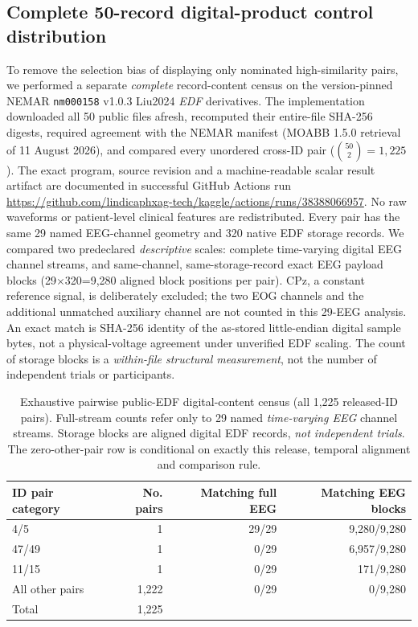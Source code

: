 \subsection{Complete 50-record digital-product control distribution}
\label{sec:p2-exhaustive-nemar}
To remove the selection bias of displaying only nominated
high-similarity pairs, we performed a separate \emph{complete}
record-content census on the version-pinned NEMAR
\texttt{nm000158} v1.0.3 Liu2024 \emph{EDF} derivatives.
The implementation downloaded all 50 public files afresh,
recomputed their entire-file SHA-256 digests, required agreement
with the NEMAR manifest (MOABB 1.5.0 retrieval of 11 August 2026),
and compared every unordered cross-ID pair
($\binom{50}{2}=1{,}225$).
The exact program, source revision and a machine-readable
scalar result artifact are documented in successful
GitHub Actions run
\url{https://github.com/lindicaphxag-tech/kaggle/actions/runs/38388066957}.
No raw waveforms or patient-level clinical features are
redistributed. Every pair has the same 29 named EEG-channel
geometry and 320 native EDF storage records. We compared
two predeclared \emph{descriptive} scales:
complete time-varying digital EEG channel streams,
and same-channel, same-storage-record exact EEG payload
blocks (29$\times$320=9,280 aligned block positions per pair).
CPz, a constant reference signal, is deliberately excluded;
the two EOG channels and the additional unmatched auxiliary
channel are not counted in this 29-EEG analysis.
An exact match is SHA-256 identity of the as-stored
little-endian digital sample bytes, not a physical-voltage
agreement under unverified EDF scaling. The count of
storage blocks is a \emph{within-file structural
measurement}, not the number of independent trials or
participants.

\begin{table}[ht]
\centering\small
\caption{Exhaustive pairwise public-EDF digital-content census
(all 1,225 released-ID pairs). Full-stream counts refer only to
29 named \emph{time-varying EEG} channel streams. Storage blocks
are aligned digital EDF records, \emph{not independent trials}.
The zero-other-pair row is conditional on exactly this
release, temporal alignment and comparison rule.}
\label{tab:p2-nemar-full50}
\begin{tabular}{lrrr}
\toprule
ID pair category & No. pairs & Matching full EEG &
 Matching EEG blocks\\
\midrule
4/5     & 1 & 29/29 & 9,280/9,280\\
47/49   & 1 & 0/29 & 6,957/9,280\\
11/15   & 1 & 0/29 & 171/9,280\\
All other pairs & 1,222 & 0/29 & 0/9,280\\
\midrule
Total & 1,225 & & \\
\bottomrule
\end{tabular}
\end{table}

